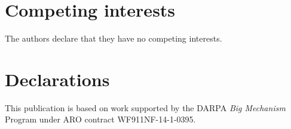\documentclass[twocolumn]{bmcart}%
\begin{document}

\begin{backmatter}
%





\section*{Competing interests}
The authors declare that they have no competing interests.


\section*{Declarations}
This publication is based on work supported by the DARPA \emph{Big Mechanism} Program under ARO contract WF911NF-14-1-0395.




\end{backmatter}
\end{document}

